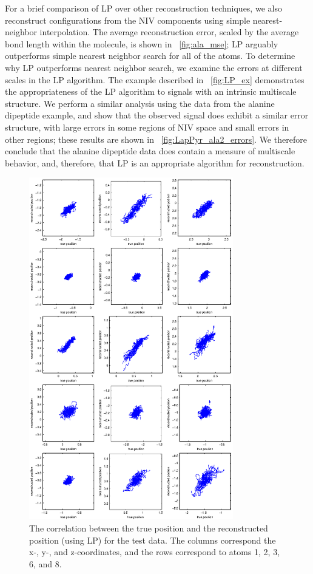 For a brief comparison of LP over other reconstruction techniques, we also reconstruct configurations from the
NIV components using simple nearest-neighbor interpolation.
%
The average reconstruction error, scaled by the average bond length within the molecule, is shown in \fig~\ref{fig:ala_mse};
LP arguably outperforms simple nearest neighbor search for all of the atoms.
%
To determine why LP outperforms nearest neighbor search, we examine the errors at different scales in the LP algorithm.
%
The example described in \fig~\ref{fig:LP_ex} demonstrates the appropriateness of the LP algorithm to signals with an intrinsic multiscale structure.
%
We perform a similar analysis using the data from the alanine dipeptide example, and show that the observed signal does exhibit a similar error structure,
with large errors in some regions of NIV space and small errors in other regions;
these results are shown in \fig~\ref{fig:LapPyr_ala2_errors}.
%
We therefore conclude that the alanine dipeptide data does contain a measure of multiscale behavior, and, therefore, that LP is an appropriate algorithm for reconstruction.

\begin{figure}[t]
  \centering
        \includegraphics[width=3.5in]{fig9}
  \caption[Laplacian Pyramids reconstruction for alanine dipeptide data]{The correlation between the true position and the reconstructed position (using LP) for the test data. The columns correspond the x-, y-, and z-coordinates, and the rows correspond to atoms 1, 2, 3, 6, and 8.}
  \label{fig:ala_recon}
\end{figure}

